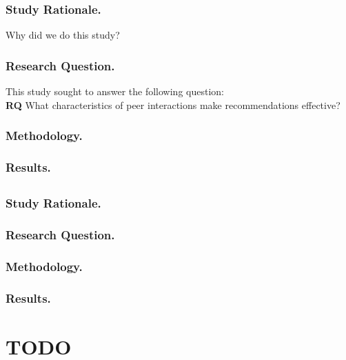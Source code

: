 \documentclass[runningheads]{llncs}
\begin{document}
\subsubsection{Study Rationale.}

Why did we do this study?

\subsubsection{Research Question.}
This study sought to answer the following question: \\

\textbf{RQ} What characteristics of peer interactions make
recommendations effective?

\subsubsection{Methodology.}

\subsubsection{Results.}

\subsection{\TOOL}


\subsubsection{Study Rationale.}

\subsubsection{Research Question.}

\subsubsection{Methodology.}

\subsubsection{Results.}

\section{TODO} 
\end{document}

